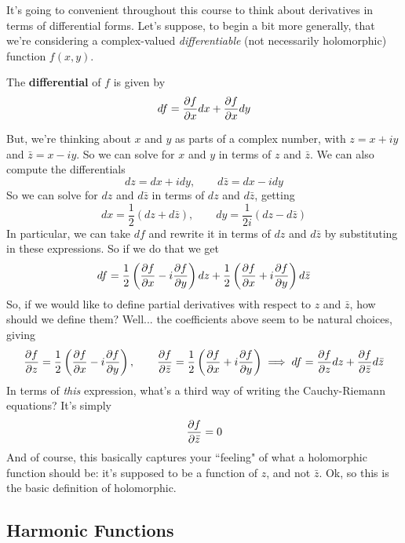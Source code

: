 \documentclass{article}
\begin{document}
It's going to convenient throughout this course to think about derivatives in terms of differential forms. Let's suppose, to begin a bit more generally, that we're considering a complex-valued \textit{differentiable} (not necessarily holomorphic) function \(f(x, y)\).
\begin{definition}
The \textbf{differential} of \(f\) is given by
\begin{equation}df = {\frac{\partial {f}}{\partial {x}}}dx + {\frac{\partial {f}}{\partial {x}}}dy\end{equation}
\end{definition}
But, we're thinking about \(x\) and \(y\) as parts of a complex number, with \(z = x + iy\) and \(\bar{z} = x - iy\). So we can solve for \(x\) and \(y\) in terms of \(z\) and \(\bar{z}\). We can also compute the differentials
\begin{equation}dz = dx + idy, \qquad d\bar{z} = dx - idy\end{equation}
So we can solve for \(dz\) and \(d\bar{z}\) in terms of \(dz\) and \(d\bar{z}\), getting
\begin{equation}dx = \frac{1}{2}(dz + d\bar{z}), \qquad dy = \frac{1}{2i}(dz - d\bar{z})\end{equation}
In particular, we can take \(df\) and rewrite it in terms of \(dz\) and \(d\bar{z}\) by substituting in these expressions. So if we do that we get
\begin{equation}df = \frac{1}{2}\left({\frac{\partial {f}}{\partial {x}}} - i{\frac{\partial {f}}{\partial {y}}}\right)dz + \frac{1}{2}\left({\frac{\partial {f}}{\partial {x}}} + i{\frac{\partial {f}}{\partial {y}}}\right)d\bar{z}\end{equation}
So, if we would like to define partial derivatives with respect to \(z\) and \(\bar{z}\), how should we define them? Well... the coefficients above seem to be natural choices, giving
\begin{equation}{\frac{\partial {f}}{\partial {z}}} = \frac{1}{2}\left({\frac{\partial {f}}{\partial {x}}} - i{\frac{\partial {f}}{\partial {y}}}\right),
  \qquad {\frac{\partial {f}}{\partial {\bar{z}}}}
= \frac{1}{2}\left({\frac{\partial {f}}{\partial {x}}} + i{\frac{\partial {f}}{\partial {y}}}\right)
\implies df = {\frac{\partial {f}}{\partial {z}}}dz + {\frac{\partial {f}}{\partial {\bar{z}}}}d\bar{z}\end{equation}
In terms of \textit{this} expression, what's a third way of writing the Cauchy-Riemann equations? It's simply
\begin{equation}{\frac{\partial {f}}{\partial {\bar{z}}}} = 0\end{equation}
And of course, this basically captures your ``feeling" of what a holomorphic function should be: it's supposed to be a function of \(z\), and not \(\bar{z}\). Ok, so this is the basic definition of holomorphic.

\subsection{Harmonic Functions}
\end{document}

